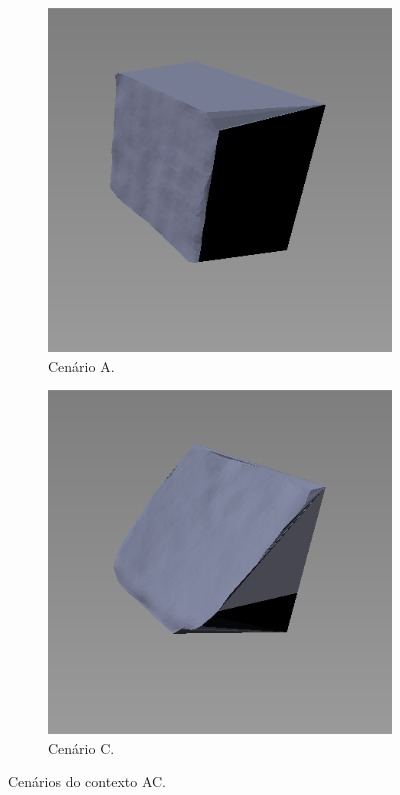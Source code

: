\begin{figure}[H]
    \centering
    \hspace{1em}
    \begin{subfigure}[t]{0.33\textwidth}
        \includegraphics[width=\textwidth]{dados/figuras/AC1.png}
        \caption{Cenário A.}
    \end{subfigure}
    \hspace{1em}
    \begin{subfigure}[t]{0.33\textwidth}
        \includegraphics[width=\textwidth]{dados/figuras/AC2.png}
        \caption{Cenário C.}
    \end{subfigure}
    \caption{Cenários do contexto AC.}
    \label{fig:contexto_ac}
\end{figure}


